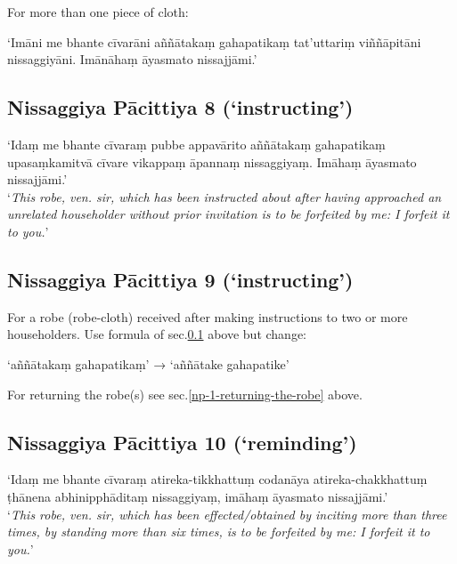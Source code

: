 For more than one piece of cloth:

‘Imāni me bhante cīvarāni aññātakaṃ gahapatikaṃ tat'uttariṃ viññāpitāni
nissaggiyāni. Imānāhaṃ āyasmato nissajjāmi.’


\subsection{Nissaggiya Pācittiya 8 (‘instructing’)}
\label{np-8-instructing}

‘Idaṃ me bhante cīvaraṃ pubbe appavārito aññātakaṃ gahapatikaṃ upasaṃkamitvā
cīvare vikappaṃ āpannaṃ nissaggiyaṃ. Imāhaṃ āyasmato nissajjāmi.’\\
‘\emph{This robe, ven. sir, which has been instructed about after having
  approached an unrelated householder without prior invitation is to be
  forfeited by me: I forfeit it to you.}’\\
\mbox{}


\vspace*{-\baselineskip}

\subsection{Nissaggiya Pācittiya 9 (‘instructing’)}

For a robe (robe-cloth) received after making instructions to two or more
householders. Use formula of sec.\ref{np-8-instructing} above but change:

‘aññātakaṃ gahapatikaṃ’ → ‘aññātake gahapatike’

For returning the robe(s) see sec.\ref{np-1-returning-the-robe} above. 

\subsection{Nissaggiya Pācittiya 10 (‘reminding’)}

‘Idaṃ me bhante cīvaraṃ atireka-tikkhattuṃ codanāya atireka-chakkhattuṃ ṭhānena
abhinipphāditaṃ nissaggiyaṃ, imāhaṃ āyasmato nissajjāmi.’\\
‘\emph{This robe, ven. sir, which has been effected/obtained by inciting more
  than three times, by standing more than six times, is to be forfeited by me: I
  forfeit it to you.}’\\
\mbox{}

